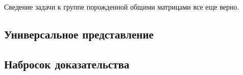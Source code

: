 Сведение задачи к группе порожденной общими матрицами все еще верно.

\subsection{Универсальное представление}

\subsection{Набросок доказательства}
